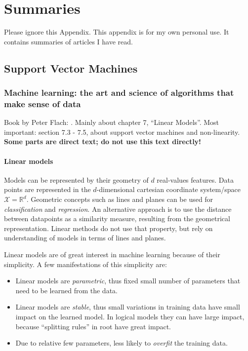 
\chapter{Summaries} %

\label{AppendixA} %


Please ignore this Appendix.
This appendix is for my own personal use.
It contains summaries of articles I have read.

\section{Support Vector Machines}

\subsection{Machine learning: the art and science of algorithms that make sense of data}
Book by Peter Flach: \cite{flach2012machine}.
Mainly about chapter 7, ``Linear Models''.
Most important: section 7.3 - 7.5, about support vector machines and non-linearity.
\textbf{Some parts are direct text; do not use this text directly!}


\subsubsection{Linear models}
Models can be represented by their geometry of $d$ real-values features.
Data points are represented in the $d$-dimensional cartesian coordinate system/space $\mathcal{X} = \mathbb{R}^d$.
Geometric concepts such as lines and planes can be used for \emph{classification} and \emph{regression}.
An alternative approach is to use the distance between datapoints as a similarity measure, resulting from the geometrical representation.
Linear methods do not use that property, but rely on understanding of models in terms of lines and planes.

Linear models are of great interest in machine learning because of their simplicity.
A few manifestations of this simplicity are:
\begin{itemize}
  \item Linear models are \emph{parametric}, thus fixed small number of parameters that need to be learned from the data.
  \item Linear models are \emph{stable}, thus small variations in training data have small impact on the learned model. In logical models they can have large impact, because ``splitting rules'' in root have great impact.
  \item Due to relative few parameters, less likely to \emph{overfit} the training data.
\end{itemize}

